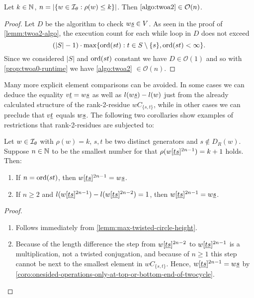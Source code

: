 \begin{lemm}
	Let $k \in \mathbb{N}$, $n = |\{ w \in \mathcal{I}_{\theta} : \rho(w) \leq k \}|$. Then $\ref{algo:twoa2} \in \mathcal{O}(n)$.

	\begin{proof}
		Let $D$ be the algorithm to check $w \underline{s} \in V$. As seen in the proof of \ref{lemm:twoa2-algo}, the execution count for each while loop in $D$ does not exceed
		$$ (|S|-1) \cdot \max \{ \operatorname{ord}(st) : t \in S \setminus \{s\}, \operatorname{ord}(st) < \infty \}. $$
		Since we considered $|S|$ and $\operatorname{ord}(st)$ constant we have $D \in \mathcal{O}(1)$ and so with \ref{prop:twoa0-runtime} we have \ref{algo:twoa2} $\in \mathcal{O}(n)$. 
	\end{proof}
\end{lemm}

Many more explicit element comparisons can be avoided. In some cases we can deduce the equality $v \underline{t} = w \underline{s}$ as well as $l(w \underline{s}) - l(w)$ just from the already calculated structure of the rank-2-residue $wC_{\{s,t\}}$, while in other cases we can preclude that $v \underline{t}$ equals $w \underline{s}$. The following two corollaries show examples of restrictions that rank-2-residues are subjected to:

\begin{coro}
	Let $w \in \mathcal{I}_{\theta}$ with $\rho(w) = k$, $s,t$ be two distinct generators and $s \notin D_R(w)$. Suppose $n \in \mathbb{N}$ to be the smallest number for that $\rho(w[\underline{t} \underline{s}]^{2n-1}) = k + 1$ holds. Then:

	\begin{enumerate}
		\item If $n = \operatorname{ord}(st)$, then $w[\underline{t} \underline{s}]^{2n-1} = w \underline{s}$.
		\item If $n \geq 2$ and $l(w[\underline{t} \underline{s}]^{2n-1}) - l(w[\underline{t} \underline{s}]^{2n-2}) = 1$, then $w[\underline{t} \underline{s}]^{2n-1} = w \underline{s}$.
	\end{enumerate}

	\begin{proof}

		\begin{enumerate}
			\item Follows immediately from \ref{lemm:max-twisted-circle-height}.
			\item Because of the length difference the step from $w[\underline{t} \underline{s}]^{2n-2}$ to $w[\underline{t} \underline{s}]^{2n-1}$ is a multiplication, not a twisted conjugation, and because of $n \geq 1$ this step cannot be next to the smallest element in $wC_{\{s,t\}}$. Hence, $w[\underline{t} \underline{s}]^{2n-1} = w \underline{s}$ by \ref{coro:onesided-operations-only-at-top-or-bottom-end-of-twocycle}. \qedhere
		\end{enumerate}
	\end{proof}
\end{coro}

